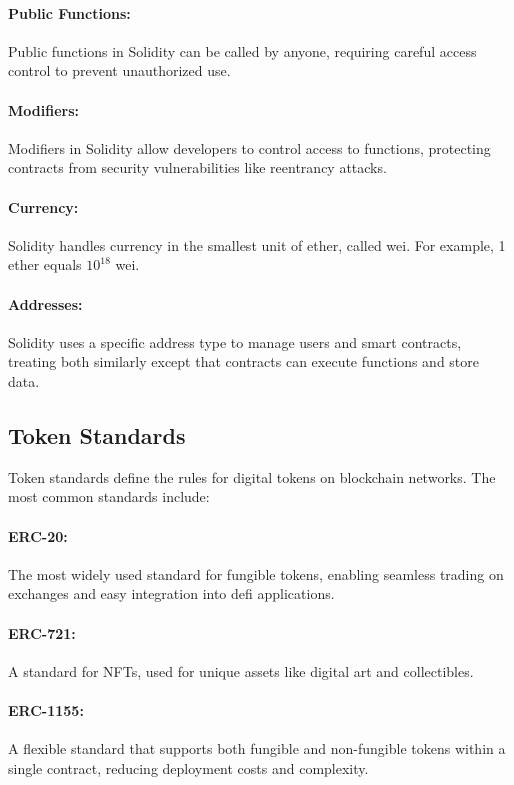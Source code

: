 \paragraph{Public Functions:}
Public functions in Solidity can be called by anyone, requiring careful access
control to prevent unauthorized use.

\paragraph{Modifiers:}
Modifiers in Solidity allow developers to control access to functions,
protecting contracts from security vulnerabilities like reentrancy attacks.

\paragraph{Currency:}
Solidity handles currency in the smallest unit of ether, called wei. For
example, 1 ether equals $10^{18}$ wei.

\paragraph{Addresses:}
Solidity uses a specific address type to manage users and smart contracts,
treating both similarly except that contracts can execute functions and store
data.

\subsection{Token Standards}
\label{subsec:token_standards}

Token standards define the rules for digital tokens on blockchain networks. The
most common standards include:

\paragraph{ERC-20:}
The most widely used standard for fungible tokens, enabling seamless trading on
exchanges and easy integration into \gls{defi} applications.

\paragraph{ERC-721:}
A standard for NFTs, used for unique assets like digital art and collectibles.

\paragraph{ERC-1155:}
A flexible standard that supports both fungible and non-fungible tokens within
a single contract, reducing deployment costs and complexity.

